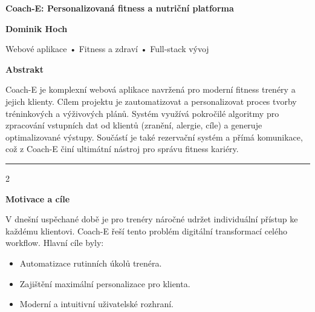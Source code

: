 \documentclass[final]{beamer}
\newcommand{\Heading}[1]{%
  \vspace{1.5em}%
  {\color{coachBlue}\bfseries\fontsize{48}{60}\selectfont #1}\par
  \vspace{0.8em}%
}
\begin{document}
\begin{frame}[t]

  \begin{center}
    {\color{coachBlue}\bfseries\fontsize{90}{110}\selectfont Coach-E: Personalizovaná fitness a nutriční platforma}\par
    \vspace{1.5cm}
    {\bfseries\fontsize{60}{70}\selectfont Dominik Hoch}\par
    \vspace{0.8cm}
    {\fontsize{40}{50}\selectfont Webové aplikace • Fitness a zdraví • Full-stack vývoj}\par
    \vspace{2cm}
  \end{center}

  \begin{center}
    \begin{minipage}{0.8\paperwidth}
      \Heading{Abstrakt}
      {\fontsize{32}{40}\selectfont
      Coach-E je komplexní webová aplikace navržená pro moderní fitness trenéry a jejich klienty. Cílem projektu je zautomatizovat a personalizovat proces tvorby tréninkových a výživových plánů. Systém využívá pokročilé algoritmy pro zpracování vstupních dat od klientů (zranění, alergie, cíle) a generuje optimalizované výstupy. Součástí je také rezervační systém a přímá komunikace, což z Coach-E činí ultimátní nástroj pro správu fitness kariéry.
      }
    \end{minipage}
  \end{center}

  \vspace{3cm}
  \noindent\rule{\linewidth}{4pt}
  \vspace{2cm}

  \begin{multicols}{2}

    \Heading{Motivace a cíle}
    V dnešní uspěchané době je pro trenéry náročné udržet individuální přístup ke každému klientovi. Coach-E řeší tento problém digitální transformací celého workflow. Hlavní cíle byly:
    \begin{itemize}
        \item Automatizace rutinních úkolů trenéra.
        \item Zajištění maximální personalizace pro klienta.
        \item Moderní a intuitivní uživatelské rozhraní.
    \end{itemize}


\end{multicols}
\end{frame}
\end{document}
